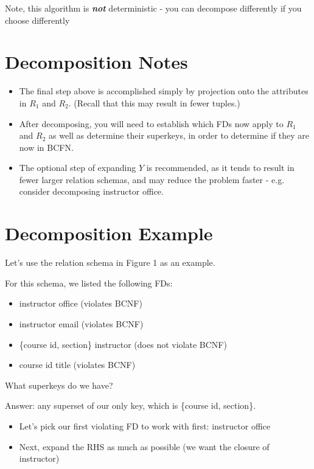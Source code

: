 \documentclass{../cheatsheet}
\begin{document}
\begin{multicols*}{2}
    Note, this algorithm is \textbf{\textit{not}} deterministic - you can decompose
    differently if you choose differently

    \section{Decomposition Notes}
    \begin{itemize}
        \item The final step above is accomplished simply by projection onto the
            attributes in $R_1$ and $R_2$. (Recall that this may result in fewer
            tuples.)

        \item After decomposing, you will need to establish which FDs now apply to
            $R_1$ and $R_2$ as well as determine their superkeys, in order to
            determine if they are now in BCFN.

        \item The optional step of expanding $Y$ is recommended, as it tends to
            result in fewer larger relation schemas, and may reduce the problem
            faster - e.g. consider decomposing instructor \textrightarrow office.
    \end{itemize}

    \columnbreak
    \section{Decomposition Example}
    Let's use the relation schema in Figure 1 as an example.

    For this schema, we listed the following FDs:

    \begin{itemize}
        \item instructor \textrightarrow office (violates BCNF)
        \item instructor \textrightarrow email (violates BCNF)
        \item \{course id, section\} \textrightarrow instructor (does not violate
            BCNF)
        \item course id \textrightarrow title (violates BCNF)
    \end{itemize}

    What superkeys do we have?

    Answer: any superset of our only key, which is \{course id, section\}.

    \begin{itemize}
        \item Let's pick our first violating FD to work with first: instructor
            \textrightarrow office
        \item Next, expand the RHS as much as possible (we want the closure of
            instructor)


\end{itemize}
\end{multicols*}
\end{document}
